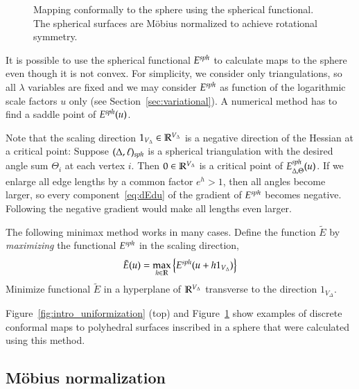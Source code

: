 \documentclass[Thesis]{subfiles}
\begin{document}
\begin{figure}
\centering
{}
\quad\quad\quad\quad\quad{}
\caption{Mapping conformally to the sphere using the spherical
  functional. The spherical surfaces are M{\"o}bius normalized to
  achieve rotational symmetry.}
\label{fig:spherical_examples}
\end{figure}

It is possible to use the spherical functional $E^{\mathit{sph}}$ to calculate
maps to the sphere even though it is not convex. For simplicity, we
consider only triangulations, so all $\lambda$ variables are fixed and
we may consider $E^{\mathit{sph}}$ as function of the logarithmic scale
factors $u$ only (see Section~\ref{sec:variational}). A numerical
method has to find a saddle point of $E^{\mathit{sph}}(u)$. 

Note that the scaling direction $1_{V_{\Delta}}\in\mathbb R^{V_{\Delta}}$ is
a negative direction of the Hessian at a critical point: Suppose
$(\Delta,\ell)_{\mathit{sph}}$ is a spherical triangulation with the desired
angle sum $\Theta_{i}$ at each vertex $i$. Then $0\in\mathbb R^{V_{\Delta}}$
is a critical point of $E^{\mathit{sph}}_{\Delta,\Theta}(u)$. If we enlarge
all edge lengths by a common factor $e^{h}>1$, then all angles become
larger, so every component~\eqref{eq:dEdu} of the gradient of
$E^{\mathit{sph}}$ becomes negative. Following the negative gradient would
make all lengths even larger.

The following minimax method works in many cases. Define the function
$\tilde E$ by \emph{maximizing} the functional $E^{\mathit{sph}}$ in the
scaling direction,
\begin{equation}
\label{eq:reduced_spherical}
\tilde E(u)=\max_{h\in\mathbb R} \left\{E^{\mathit{sph}}(u + h1_{V_{\Delta}})\right\}
\end{equation}
Minimize functional $\tilde E$ in a hyperplane of $\mathbb R^{V_{\Delta}}$
transverse to the direction $1_{V_{\Delta}}$.

Figure~\ref{fig:intro_uniformization} (top) and
Figure~\ref{fig:spherical_examples} show examples of discrete
conformal maps to polyhedral surfaces inscribed in a sphere that were
calculated using this method.

\subsection{M{\"o}bius normalization}
\label{sec:moebius_normalization}
\end{document}

